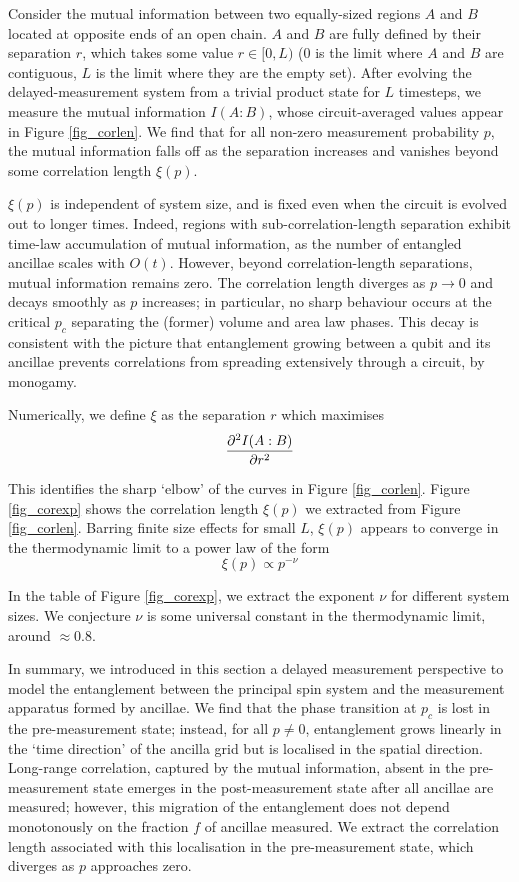 \documentclass[10pt]{article}
\begin{document}
Consider the mutual information between two equally-sized regions $A$ and $B$ located at opposite ends of an open chain. $A$ and $B$ are fully defined by their separation $r$, which takes some value $r \in [0,L)$ (0 is the limit where $A$ and $B$ are contiguous, $L$ is the limit where they are the empty set). After evolving the delayed-measurement system from a trivial product state for $L$ timesteps, we measure the mutual information $I(A:B)$, whose circuit-averaged values appear in Figure \ref{fig_corlen}. We find that for all non-zero measurement probability $p$, the mutual information falls off as the separation increases and vanishes beyond some correlation length $\xi(p)$. 

$\xi(p)$ is independent of system size, and is fixed even when the circuit is evolved out to longer times. Indeed, regions with sub-correlation-length separation exhibit time-law accumulation of mutual information, as the number of entangled ancillae scales with $O(t)$. However, beyond correlation-length separations, mutual information remains zero. The correlation length diverges as $p\rightarrow0$ and decays smoothly as $p$ increases; in particular, no sharp behaviour occurs at the critical $p_c$ separating the (former) volume and area law phases. This decay is consistent with the picture that entanglement growing between a qubit and its ancillae prevents correlations from spreading extensively through a circuit, by monogamy.

Numerically, we define $\xi$ as the separation $r$ which maximises 
\begin{equation}
\pdv[2]{I(A:B)}{r}
\end{equation}

This identifies the sharp `elbow' of the curves in Figure \ref{fig_corlen}. Figure \ref{fig_corexp} shows the correlation length $\xi(p)$ we extracted from Figure \ref{fig_corlen}. Barring finite size effects for small $L$, $\xi(p)$ appears to converge in the thermodynamic limit to a power law of the form
\begin{equation}
\xi(p) \propto p^{-\nu}
\end{equation}

In the table of Figure \ref{fig_corexp}, we extract the exponent $\nu$ for different system sizes. We conjecture $\nu$ is some universal constant in the thermodynamic limit, around $\approx0.8$. 

In summary, we introduced in this section a delayed measurement perspective to model the entanglement between the principal spin system and the measurement apparatus formed by ancillae. We find that the phase transition at $p_c$ is lost in the pre-measurement state; instead, for all $p\neq0$, entanglement grows linearly in the `time direction' of the ancilla grid but is localised in the spatial direction. Long-range correlation, captured by the mutual information, absent in the pre-measurement state emerges in the post-measurement state after all ancillae are measured; however, this migration of the entanglement does not depend monotonously on the fraction $f$ of ancillae measured. We extract the correlation length associated with this localisation in the pre-measurement state, which diverges as $p$ approaches zero.
\end{document}

